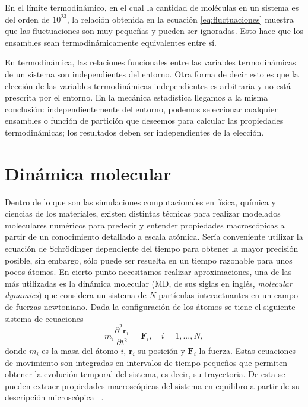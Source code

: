En el límite termodinámico, en el cual la cantidad de moléculas en un sistema es 
del orden de $10^{23}$, la relación obtenida en la ecuación \ref{eq:fluctuaciones} 
muestra que las fluctuaciones son muy pequeñas y pueden ser ignoradas. Esto hace 
que los ensambles sean termodinámicamente equivalentes entre sí.

En termodinámica, las relaciones funcionales entre las variables termodinámicas 
de un sistema son independientes del entorno. Otra forma de decir esto es que la 
elección de las variables termodinámicas independientes es arbitraria y no está 
prescrita por el entorno. En la mecánica estadística llegamos a la misma 
conclusión: independientemente del entorno, podemos seleccionar cualquier ensambles
o función de partición que deseemos para calcular las propiedades termodinámicas; 
los resultados deben ser independientes de la elección.


\section{Dinámica molecular}\label{md}

Dentro de lo que son las simulaciones computacionales en física, química y
ciencias de los materiales, existen distintas técnicas para realizar modelados
moleculares numéricos para predecir y entender propiedades macroscópicas a partir
de un conocimiento detallado a escala atómica. Sería conveniente utilizar la 
ecuación de Schrödinger dependiente del tiempo para obtener la mayor precisión 
posible, sin embargo, sólo puede ser resuelta en un tiempo razonable para unos 
pocos átomos. En cierto punto necesitamos realizar aproximaciones, una de las más
utilizadas es la dinámica molecular (MD, de sus siglas en inglés, 
\textit{molecular dynamics}) que considera un sistema de $N$ partículas 
interactuantes en un campo de fuerzas newtoniano. Dada la configuración de los 
átomos se tiene el siguiente sistema de ecuaciones
$$
m_i \frac{\partial^2 \mathbf{r}_i}{\partial t^2} = \mathbf{F}_i, \quad i = 1,..., N,
$$
donde $m_i$ es la masa del átomo $i$, $\mathbf{r}_i$ su posición y $\mathbf{F}_i$
la fuerza. Estas ecuaciones de movimiento son integradas en intervalos de tiempo
pequeños que permiten obtener la evolución temporal del sistema, es decir, su
trayectoria. De esta se pueden extraer propiedades macroscópicas del sistema en
equilibro a partir de su descripción microscópica ~\cite{frenkel2001, allen2017}.

